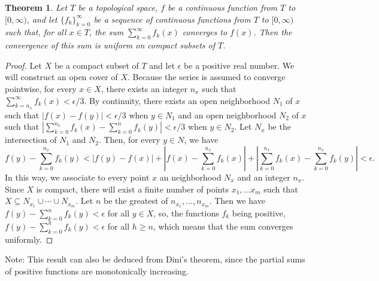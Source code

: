 \documentclass[12pt]{article}
\newtheorem{thm}{Theorem}
\begin{document}
\begin{thm}
Let $T$ be a topological space, $f$ be a continuous function from $T$ to $[0,\infty)$, and 
let $\{f_k\}_{k=0}^\infty$ be a sequence of continuous functions from $T$ to $[0,\infty)$
such that, for all $x \in T$, the sum $\sum_{k=0}^\infty f_k (x)$ converges to $f(x)$.  Then 
the convergence of this sum is uniform on compact subsets of $T$.
\end{thm}

\begin{proof}
Let $X$ be a compact subset of $T$ and let $\epsilon$ be a positive real number.  We will
construct an open cover of $X$.  Because the series is assumed to converge pointwise, for 
every $x \in X$, there exists  an integer $n_x$ such that $\sum_{k=n_x}^\infty f_k (x) < \epsilon 
/ 3$.  By continuity, there exists an open neighborhood $N_1$ of $x$ such that $|f(x) - f(y)| 
< \epsilon /3$ when $y \in N_1$ and an open neighborhood $N_2$ of $x$ such that $\left| 
\sum_{k=0}^{n_x} f_k (x) - \sum_{k=0}^n  f_k (y) \right| < \epsilon / 3$ when $y \in N_2$.  
Let $N_x$ be the intersection of $N_1$ and $N_2$.  Then, for every $y \in N$, we have
\[
 f(y) - \sum_{k=0}^{n_x} f_k (y) < |f(y) - f(x)| + 
                                   \left| f(x) - \sum_{k=0}^{n_x} f_k (x) \right| +
                                   \left| \sum_{k=0}^{n_x} f_k (x) - \sum_{k=0}^{n_x} f_k (y) \right|
                                 < \epsilon .
\]
In this way, we associate to every point $x$ an neighborhood $N_x$ and an integer $n_x$.
Since $X$ is compact, there will exist a finite number of points $x_1, \ldots x_m$ such 
that $X \subseteq N_{x_1} \cup \cdots \cup N_{x_m}$.  Let $n$ be the greatest of $n_{x_1}, 
\ldots, n_{x_m}$.  Then we have $f(y) - \sum_{k=0}^n f_k (y) < \epsilon$ for all $y \in X$,
so, the functions $f_k$ being positive, $f(y) - \sum_{k=0}^h f_k (y) < \epsilon$ for all
$h \ge n$, which means that the sum converges uniformly.
\end{proof}

Note: This result can also be deduced from Dini's theorem, 
since the partial sums of positive functions are monotonically increasing.
\end{document}
